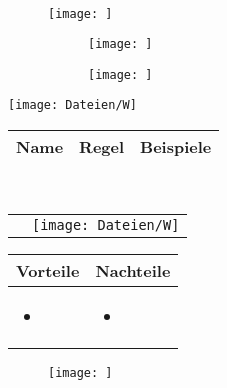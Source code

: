 
\begin{eqnarray*}

\end{eqnarray*}



\begin{figure}[htbp]
\centering
\texttt{[image: ]}
\caption*{}
\end{figure}


\begin{figure}[htbp]
\centering
\begin{subfigure}{.49\textwidth}
    \texttt{[image: ]}
\end{subfigure}
\begin{subfigure}{.49\textwidth}
    \texttt{[image: ]}
\end{subfigure}
\caption{}
\end{figure}

\begin{center}
    \texttt{[image: Dateien/W]}
\end{center}


\begin{tabular}{l|l|l}
    \textbf{Name} &\textbf{ Regel }&\textbf{ Beispiele} \\
    \hline
    
\end{tabular}\\



\begin{tabular}{c l}
\parbox[b]{6cm}{

} & \texttt{[image: Dateien/W]}
\end{tabular}


\begin{tabularx}{\linewidth}{X|X}
\textbf{Vorteile} & \textbf{Nachteile}\\
\hline
\vspace{-0.5cm}
\begin{itemize}[leftmargin=*]
    \item 
\end{itemize}
& 
\vspace{-0.5cm}
\begin{itemize}[leftmargin=*]
    \item 
\end{itemize}
\end{tabularx}




\begin{wrapfigure}{r}[0pt]{.35\textwidth}
 \vspace{-15pt}
\texttt{[image: ]}
 \vspace{-15pt}
\end{wrapfigure}